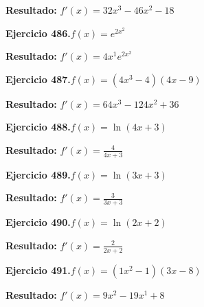 \documentclass[10pt,a4paper]{article}
\begin{document}
\begin{solbox}
\textbf{Resultado:} \(\displaystyle f'(x) = 32x^{3} -46x^{2} -18\)
\end{solbox}

\begin{ejbox}
\textbf{Ejercicio 486.}\quad $f(x) = e^{2x^{2}}$
\end{ejbox}

\begin{solbox}
\textbf{Resultado:} \(\displaystyle f'(x) = 4x^{1}e^{2x^{2}}\)
\end{solbox}

\newpage
\begin{ejbox}
\textbf{Ejercicio 487.}\quad $f(x) = (4x^{3} -4)(4x -9)$
\end{ejbox}

\begin{solbox}
\textbf{Resultado:} \(\displaystyle f'(x) = 64x^{3} -124x^{2} +36\)
\end{solbox}

\begin{ejbox}
\textbf{Ejercicio 488.}\quad $f(x) = \ln(4x + 3)$
\end{ejbox}

\begin{solbox}
\textbf{Resultado:} \(\displaystyle f'(x) = \frac{4}{4x + 3}\)
\end{solbox}

\begin{ejbox}
\textbf{Ejercicio 489.}\quad $f(x) = \ln(3x + 3)$
\end{ejbox}

\begin{solbox}
\textbf{Resultado:} \(\displaystyle f'(x) = \frac{3}{3x + 3}\)
\end{solbox}

\newpage
\begin{ejbox}
\textbf{Ejercicio 490.}\quad $f(x) = \ln(2x + 2)$
\end{ejbox}

\begin{solbox}
\textbf{Resultado:} \(\displaystyle f'(x) = \frac{2}{2x + 2}\)
\end{solbox}

\begin{ejbox}
\textbf{Ejercicio 491.}\quad $f(x) = (1x^{2} -1)(3x -8)$
\end{ejbox}

\begin{solbox}
\textbf{Resultado:} \(\displaystyle f'(x) = 9x^{2} -19x^{1} +8\)
\end{solbox}
\end{document}
